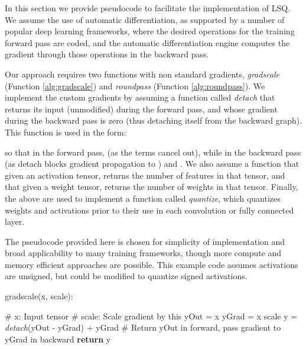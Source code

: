 \documentclass{article}
\begin{document}
\newcommand{\algrule}[1][.2pt]{\par\vskip0.2\baselineskip\hrule height #1\par\vskip.2\baselineskip}

In this section we provide pseudocode to facilitate the implementation of LSQ.
We assume the use of automatic differentiation, as supported by a number of popular deep learning frameworks, where the desired operations for the training forward pass are coded, and the automatic differentiation engine computes the gradient through those operations in the backward pass.

Our approach requires two functions with non standard gradients, \textit{gradscale} (Function \ref{alg:gradscale}) and \textit{roundpass} (Function \ref{alg:roundpass}).
We implement the custom gradients by assuming a function called \textit{detach} that returns its input (unmodified) during the forward pass, and whose gradient during the backward pass is zero (thus detaching itself from the backward graph).
This function is used in the form:

so that in the forward pass,  (as the  terms cancel out), while in the backward pass  (as detach blocks gradient propagation to ) and .
We also assume a function  that given an activation tensor, returns the number of features in that tensor, and  that given a weight tensor, returns the number of weights in that tensor.
Finally, the above are used to implement a function called \textit{quantize}, which quantizes weights and activations prior to their use in each convolution or fully connected layer.


The pseudocode provided here is chosen for simplicity of implementation and broad applicability to many training frameworks, though more compute and memory efficient approaches are possible.
This example code assumes activations are unsigned, but could be modified to quantize signed activations.




\setcounter{algorithm}{0}

\begin{algorithm}
   \caption{gradscale(x, scale):}
   \label{alg:gradscale}
\begin{algorithmic}
   \STATE \# x: Input tensor   
   \STATE \# scale: Scale gradient by this
   \STATE yOut = x
   \STATE yGrad = x  scale
   \STATE y = \textit{detach}(yOut - yGrad) + yGrad \# Return yOut in forward, pass gradient to yGrad in backward
   \STATE \textbf{return} y
\end{algorithmic}
\end{algorithm}
\end{document}
